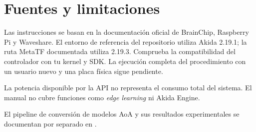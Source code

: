\chapter{Fuentes y limitaciones}
\label{app:fuentes}

Las instrucciones se basan en la documentación oficial de BrainChip, Raspberry Pi y Waveshare.
El entorno de referencia del repositorio utiliza Akida 2.19.1; la ruta MetaTF documentada
utiliza 2.19.3. Comprueba la compatibilidad del controlador con tu kernel y SDK.
La ejecución completa del procedimiento con un usuario nuevo y una placa física sigue pendiente.

La potencia disponible por la API no representa el consumo total del sistema.
El manual no cubre funciones como \emph{edge learning} ni Akida Engine.

El pipeline de conversión de modelos AoA y sus resultados experimentales se documentan
por separado en \href{https://github.com/AlvaroPRuiiz/akida-model-deployment-pipeline}{}.

